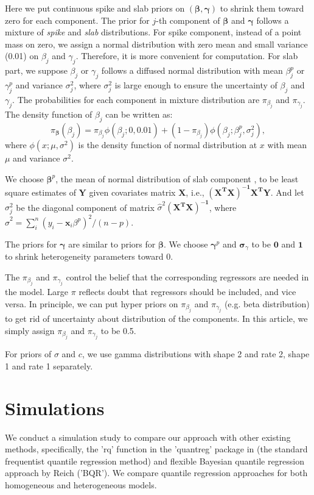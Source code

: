 \documentclass[12pt]{article}
\begin{document}
Here we put continuous spike and slab priors on $(\bm \beta, \bm
\gamma)$ to shrink them toward zero for each component. The prior for
$j$-th component of $\bm \beta$ and $\bm \gamma$ follows a mixture of
\textit{spike} and \textit{slab} distributions. For spike component,
instead of a point mass on zero, we assign a normal distribution with
zero mean and small variance (0.01) on $\beta_j$ and $\gamma_j$.
Therefore, it is more convenient for computation.  For slab part, we
suppose $\beta_j$ or $\gamma_j$ follows a diffused normal distribution
with mean $\beta_j^p$ or $\gamma_j^p$ and variance $\sigma_j^2$, where
$\sigma_j^2$ is large enough to ensure the uncertainty of $\beta_j$
and $\gamma_j$.  The probabilities for each component in mixture
distribution are $\pi_{\beta_j}$ and $\pi_{\gamma_j}$. The density
function of $\beta_j$ can be written as:
\begin{equation*}
  \pi_{\bm \beta} (\beta_j) = \pi_{\beta_j} \phi(\beta_j; 0, 0.01) +
  (1- \pi_{\beta_j}) \phi(\beta_j; \beta_j^p, \sigma_j^2),
\end{equation*}
where $\phi(x; \mu, \sigma^2)$ is the density function of normal
distribution at $x$ with mean $\mu$ and variance $\sigma^2$.

We choose $\bm \beta^p$, the mean of normal distribution of slab
component , to be least square estimates of $\bm Y$ given covariates
matrix $\bm X$, i.e., $\bm{(X^TX)^{-1}X^TY}$. And let $\sigma_j^2$ be
the diagonal component of matrix $\hat{\sigma}^2 \bm{(X^TX)^{-1}}$,
where $\hat{\sigma}^2 = \sum_i^n (y_i - \bm x_i\beta^p)^2/(n - p)$.

The priors for $\bm \gamma$ are similar to priors for $\bm \beta$. We
choose $\bm \gamma^p$ and $\bm \sigma_{\gamma}$ to be $\bm 0$ and $\bm
1$ to shrink heterogeneity parameters toward 0.

The $\pi_{\beta_j}$ and $\pi_{\gamma_j}$ control the belief that the
corresponding regressors are needed in the model. Large $\pi$ reflects
doubt that regressors should be included, and vice versa.  In
principle, we can put hyper priors on $\pi_{\beta_j}$ and
$\pi_{\gamma_j}$ (e.g. beta distribution) to get rid of uncertainty
about distribution of the components.  In this article, we simply
assign $\pi_{\beta_j}$ and $\pi_{\gamma_j}$ to be 0.5.

For priors of $\sigma$ and $c$, we use gamma distributions with shape
2 and rate 2, shape 1 and rate 1 separately.

\section{Simulations}
We conduct a simulation study to compare our approach with other
existing methods, specifically, the 'rq' function in the 'quantreg'
package in \cite{R} (the standard frequentist quantile regression
method) and flexible Bayesian quantile regression approach by Reich
('BQR').  We compare quantile regression approaches for both
homogeneous and heterogeneous models.
\end{document}
